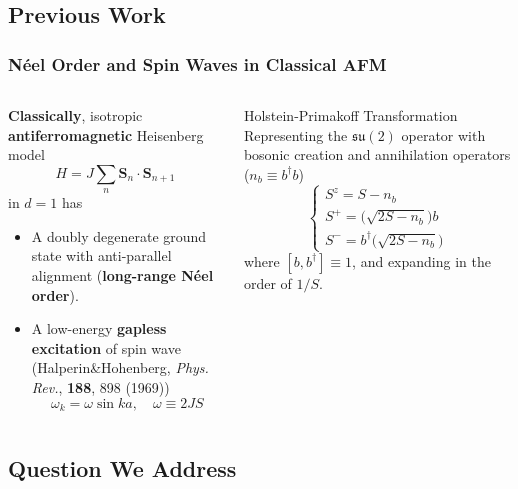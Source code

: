 \documentclass[10pt,aspectratio=43,xcolor=x11names,t]{beamer}%
\begin{document}
	\subsection{Previous Work}
		\begin{frame}\frametitle{N\'{e}el Order and Spin Waves in Classical AFM}
			\begin{columns}
				\begin{column}{0.5\textwidth}
					\textbf{\color{red}Classically}, isotropic \textbf{antiferromagnetic} Heisenberg model
					\begin{equation*}
						H=J\sum_n\bm{S}_n\cdot\bm{S}_{n+1}
					\end{equation*}
					in $d=1$ has
					\begin{itemize}
						\item A doubly degenerate ground state with anti-parallel alignment (\textbf{\color{red}long-range N\'{e}el order}).
						\item A low-energy \textbf{\color{red}gapless excitation} of spin wave ({\scriptsize Halperin\&Hohenberg, \textit{Phys. Rev.}, \textbf{188}, 898 (1969)})
						\begin{equation*}
							\omega_k=\omega\sin ka,\quad \omega\equiv 2JS
						\end{equation*}
					\end{itemize}
				\end{column}
				\pause
				\begin{column}{0.5\textwidth}
					\begin{block}{Holstein-Primakoff Transformation}
						Representing the $\mathfrak{su}(2)$ operator with bosonic creation and annihilation operators ($n_b\equiv b^\dagger b$)
						\begin{equation*}
							\begin{cases}
								S^z=S-n_b\\
								S^+=\bigg(\sqrt{2S-n_b}\bigg)b\\
								S^-=b^\dagger\bigg(\sqrt{2S-n_b}\bigg)
							\end{cases}
						\end{equation*}
						where $[b,b^\dagger]\equiv1$, and expanding in the order of $1/S$.
					\end{block}
				\end{column}
			\end{columns}
		\end{frame}

	\subsection{Question We Address}
\end{document}
